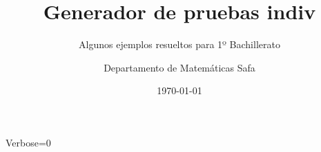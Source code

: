 \documentclass[nochap,palatino,nobuilddate]{estudioFuncion}
\title{Generador de pruebas indiv}
\author{Departamento de Matemáticas Safa}
\date{\today}
\subtitle{Algunos ejemplos resueltos para 1º Bachillerato}
\newif\ifverbose
\begin{document}


\ifverbose
	\begin{sagesilent}
		Verbose=1
	\end{sagesilent}
\else
	\begin{sagesilent}
		Verbose=0
	\end{sagesilent}
\fi


\end{document}
